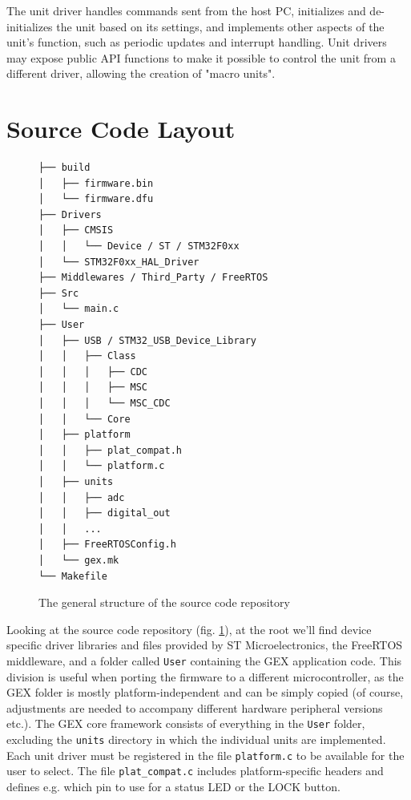 The unit driver handles commands sent from the host PC, initializes and de-initializes the unit based on its settings, and implements other aspects of the unit's function, such as periodic updates and interrupt handling. Unit drivers may expose public API functions to make it possible to control the unit from a different driver, allowing the creation of "macro units".

\section{Source Code Layout}

\begin{figure}
	\scriptsize\vspace{-3em}
	\begin{verbatim}
├── build
│   ├── firmware.bin
│   └── firmware.dfu
├── Drivers
│   ├── CMSIS
│   │   └── Device / ST / STM32F0xx
│   └── STM32F0xx_HAL_Driver
├── Middlewares / Third_Party / FreeRTOS
├── Src
│   └── main.c
├── User
│   ├── USB / STM32_USB_Device_Library
│   │   ├── Class
│   │   │   ├── CDC
│   │   │   ├── MSC
│   │   │   └── MSC_CDC
│   │   └── Core
│   ├── platform
│   │   ├── plat_compat.h
│   │   └── platform.c
│   ├── units
│   │   ├── adc
│   │   ├── digital_out
│   │   ...
│   ├── FreeRTOSConfig.h
│   └── gex.mk
└── Makefile	
	\end{verbatim}
	\vspace{-1em}
	\cprotect\caption{\label{fig:repo-structure} The general structure of the source code repository}
\end{figure}

Looking at the source code repository (fig. \ref{fig:repo-structure}), at the root we'll find device specific driver libraries and files provided by ST Microelectronics, the FreeRTOS middleware, and a folder called \verb|User| containing the GEX application code. This division is useful when porting the firmware to a different microcontroller, as the GEX folder is mostly platform-independent and can be simply copied (of course, adjustments are needed to accompany different hardware peripheral versions etc.). The GEX core framework consists of everything in the \verb|User| folder, excluding the \verb|units| directory in which the individual units are implemented. Each unit driver must be registered in the file \verb|platform.c| to be available for the user to select. The file \verb|plat_compat.c| includes platform-specific headers and defines e.g. which pin to use for a status LED or the LOCK button.

